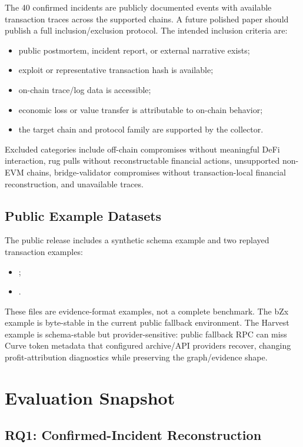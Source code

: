 \documentclass[10pt]{article}
\newcommand{\numincidents}{40\xspace}
\begin{document}
The \numincidents confirmed incidents are publicly documented events with
available transaction traces across the supported chains. A future polished
paper should publish a full inclusion/exclusion protocol. The intended
inclusion criteria are:
\begin{itemize}
  \item public postmortem, incident report, or external narrative exists;
  \item exploit or representative transaction hash is available;
  \item on-chain trace/log data is accessible;
  \item economic loss or value transfer is attributable to on-chain behavior;
  \item the target chain and protocol family are supported by the collector.
\end{itemize}
Excluded categories include off-chain compromises without meaningful DeFi
interaction, rug pulls without reconstructable financial actions, unsupported
non-EVM chains, bridge-validator compromises without transaction-local
financial reconstruction, and unavailable traces.

\subsection{Public Example Datasets}

The public release includes a synthetic schema example and two replayed
transaction examples:
\begin{itemize}
  \item {};
  \item {}.
\end{itemize}
These files are evidence-format examples, not a complete benchmark. The bZx
example is byte-stable in the current public fallback environment. The Harvest
example is schema-stable but provider-sensitive: public fallback RPC can miss
Curve token metadata that configured archive/API providers recover, changing
profit-attribution diagnostics while preserving the graph/evidence shape.

\section{Evaluation Snapshot}
\label{sec:evaluation}

\subsection{RQ1: Confirmed-Incident Reconstruction}
\end{document}
